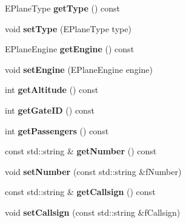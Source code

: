 \begin{DoxyCompactItemize}
\item 
E\+Plane\+Type {\bfseries get\+Type} () const \hypertarget{classAirplane_a6ba13e6c94762127b5b87238f9fbb037}{}\label{classAirplane_a6ba13e6c94762127b5b87238f9fbb037}

\item 
void {\bfseries set\+Type} (E\+Plane\+Type type)\hypertarget{classAirplane_acaf1e610b7b45804e1ae27408fd9f40f}{}\label{classAirplane_acaf1e610b7b45804e1ae27408fd9f40f}

\item 
E\+Plane\+Engine {\bfseries get\+Engine} () const \hypertarget{classAirplane_a7c594903638696b53c2dd823fe33ecf2}{}\label{classAirplane_a7c594903638696b53c2dd823fe33ecf2}

\item 
void {\bfseries set\+Engine} (E\+Plane\+Engine engine)\hypertarget{classAirplane_a9df8583afc31aad36bf893db5fc37dbd}{}\label{classAirplane_a9df8583afc31aad36bf893db5fc37dbd}

\item 
int {\bfseries get\+Altitude} () const \hypertarget{classAirplane_ad2550909ab563f7df850f79f23c3a308}{}\label{classAirplane_ad2550909ab563f7df850f79f23c3a308}

\item 
int {\bfseries get\+Gate\+ID} () const \hypertarget{classAirplane_acab03ea6ec6df824368bf9851316e140}{}\label{classAirplane_acab03ea6ec6df824368bf9851316e140}

\item 
int {\bfseries get\+Passengers} () const \hypertarget{classAirplane_acd0cbb46d1c8a17a5eb4f5ab679f2dcb}{}\label{classAirplane_acd0cbb46d1c8a17a5eb4f5ab679f2dcb}

\item 
const std\+::string \& {\bfseries get\+Number} () const \hypertarget{classAirplane_a2341fbcce9704ffdb81f7638ab74c0cb}{}\label{classAirplane_a2341fbcce9704ffdb81f7638ab74c0cb}

\item 
void {\bfseries set\+Number} (const std\+::string \&f\+Number)\hypertarget{classAirplane_aaf68ef47d3ce790e39f629a4441459c7}{}\label{classAirplane_aaf68ef47d3ce790e39f629a4441459c7}

\item 
const std\+::string \& {\bfseries get\+Callsign} () const \hypertarget{classAirplane_a6a62bd06d28789336c5ce1543d9391f1}{}\label{classAirplane_a6a62bd06d28789336c5ce1543d9391f1}

\item 
void {\bfseries set\+Callsign} (const std\+::string \&f\+Callsign)\hypertarget{classAirplane_a40a6b914a5f719f346dc983dc9e7ffd3}{}\label{classAirplane_a40a6b914a5f719f346dc983dc9e7ffd3}


\end{DoxyCompactItemize}
